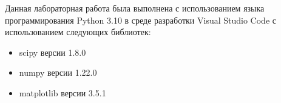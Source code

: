 Данная лабораторная работа была выполнена с использованием языка
программирования Python 3.10 в среде разработки Visual Studio Code с
использованием следующих библиотек:
\begin{itemize}
\item scipy версии 1.8.0
\item numpy версии 1.22.0
\item matplotlib версии 3.5.1
\end{itemize}
